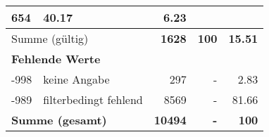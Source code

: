 \begin{longtable}{lXrrr}
       \num{654} &
       \num[round-mode=places,round-precision=2]{40.17} &
         \num[round-mode=places,round-precision=2]{6.23} \\
     \midrule
     \multicolumn{2}{l}{Summe (gültig)} &
       \textbf{\num{1628}} &
     \textbf{\num{100}} &
       \textbf{\num[round-mode=places,round-precision=2]{15.51}} \\
     \multicolumn{5}{l}{\textbf{Fehlende Werte}}\\
       -998 &
       keine Angabe &
         \num{297} &
        - &
         \num[round-mode=places,round-precision=2]{2.83} \\
       -989 &
       filterbedingt fehlend &
         \num{8569} &
        - &
         \num[round-mode=places,round-precision=2]{81.66} \\
     \midrule
     \multicolumn{2}{l}{\textbf{Summe (gesamt)}} &
          \textbf{\num{10494}} &
        \textbf{-} &
        \textbf{\num{100}} \\
     \bottomrule
     \end{longtable}
     
